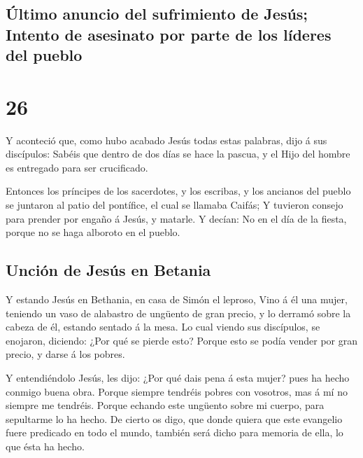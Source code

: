 \hypertarget{uxfaltimo-anuncio-del-sufrimiento-de-jesuxfas-intento-de-asesinato-por-parte-de-los-luxedderes-del-pueblo}{%
\subsection{Último anuncio del sufrimiento de Jesús; Intento de
asesinato por parte de los líderes del
pueblo}\label{uxfaltimo-anuncio-del-sufrimiento-de-jesuxfas-intento-de-asesinato-por-parte-de-los-luxedderes-del-pueblo}}

\hypertarget{section-25}{%
\section{26}\label{section-25}}

 Y aconteció que, como hubo acabado Jesús todas estas
palabras, dijo á sus discípulos:  Sabéis que dentro de dos
días se hace la pascua, y el Hijo del hombre es entregado para ser
crucificado.

 Entonces los príncipes de los sacerdotes, y los escribas,
y los ancianos del pueblo se juntaron al patio del pontífice, el cual se
llamaba Caifás;  Y tuvieron consejo para prender por
engaño á Jesús, y matarle.  Y decían: No en el día de la
fiesta, porque no se haga alboroto en el pueblo.

\hypertarget{unciuxf3n-de-jesuxfas-en-betania}{%
\subsection{Unción de Jesús en
Betania}\label{unciuxf3n-de-jesuxfas-en-betania}}

 Y estando Jesús en Bethania, en casa de Simón el leproso,
 Vino á él una mujer, teniendo un vaso de alabastro de
ungüento de gran precio, y lo derramó sobre la cabeza de él, estando
sentado á la mesa.  Lo cual viendo sus discípulos, se
enojaron, diciendo: ¿Por qué se pierde esto?  Porque esto
se podía vender por gran precio, y darse á los pobres.

 Y entendiéndolo Jesús, les dijo: ¿Por qué dais pena á
esta mujer? pues ha hecho conmigo buena obra.  Porque
siempre tendréis pobres con vosotros, mas á mí no siempre me tendréis.
 Porque echando este ungüento sobre mi cuerpo, para
sepultarme lo ha hecho.  De cierto os digo, que donde
quiera que este evangelio fuere predicado en todo el mundo, también será
dicho para memoria de ella, lo que ésta ha hecho.

